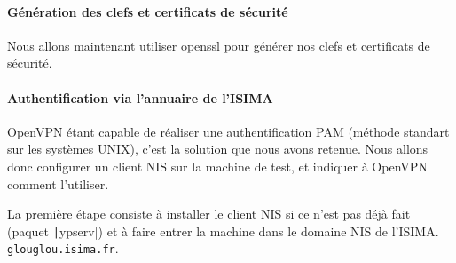 \paragraph{Génération des clefs et certificats de sécurité}

Nous allons maintenant utiliser openssl pour générer nos clefs et certificats de sécurité.



\paragraph{Authentification via l'annuaire de l'ISIMA}

OpenVPN étant capable de réaliser une authentification PAM (méthode standart sur les systèmes UNIX), c'est la solution que nous avons retenue. Nous allons donc configurer un client NIS sur la machine de test, et indiquer à OpenVPN comment l'utiliser.

La première étape consiste à installer le client NIS si ce n'est pas déjà fait (paquet \texttt|ypserv|) et à faire entrer la machine dans le domaine NIS de l'ISIMA. \texttt{glouglou.isima.fr}.



\pagebreak


% 
